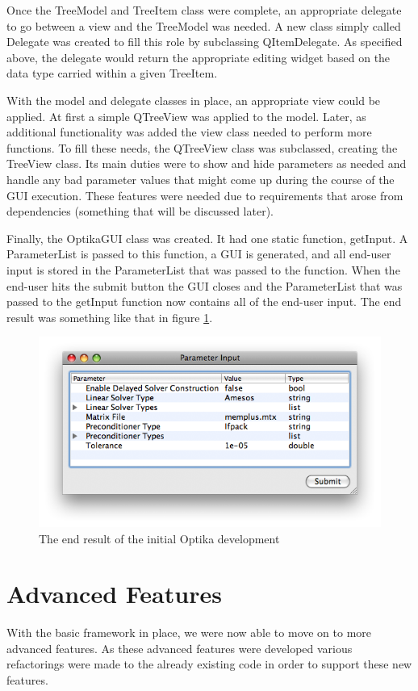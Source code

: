 Once the TreeModel and TreeItem class were complete, an appropriate delegate to go between a view
and the TreeModel was needed. A new class simply called Delegate was created to fill this
role by subclassing QItemDelegate. As specified above, the delegate would return
the appropriate editing widget based on the data type carried within a given TreeItem.

With the model and delegate classes in place, an appropriate view could be applied. At first a simple
QTreeView was applied to the model. Later, as additional functionality was added the view class needed to perform more functions. 
To fill these needs, the QTreeView class was subclassed, creating the TreeView class. 
Its main duties were to show and hide parameters as needed and handle any bad parameter values that might
come up during the course of the GUI execution.  These features were needed due to requirements that arose from dependencies (something
that will be discussed later).

Finally, the OptikaGUI class was created. It had one static function, getInput. A ParameterList is passed to this function, a
GUI is generated, and all end-user input is stored in the ParameterList that was passed to the function. When the end-user hits the submit
button the GUI closes and the ParameterList that was passed to the getInput function now contains all of the end-user input. The end result was something like that in figure \ref{treeviewFig}.
	\begin{figure}[h]
		\centering
		\label{treeviewFig}
		\includegraphics[scale=0.5]{graphics/treeview}
		\caption{The end result of the initial Optika development}
	\end{figure}

\section{Advanced Features}
With the basic framework in place, we were now able to move on to more advanced features. As these advanced features
were developed various refactorings were made to the already existing code in order to support these new features.

